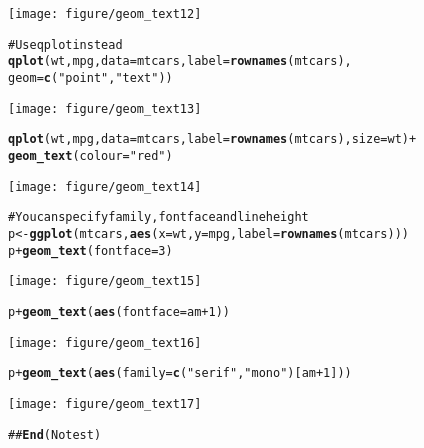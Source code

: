 \documentclass[a4paper,titlepage]{tufte-handout}\usepackage{graphicx, color}
\makeatletter
\def\maxwidth{ %
  \ifdim\Gin@nat@width>\linewidth
    \linewidth
  \else
    \Gin@nat@width
  \fi
}
\newcommand{\hlfunctioncall}[1]{\textcolor[rgb]{0.501960784313725,0,0.329411764705882}{\textbf{#1}}}%
\newcommand{\hlstring}[1]{\textcolor[rgb]{0.6,0.6,1}{#1}}%
\newcommand{\hlcomment}[1]{\textcolor[rgb]{0.180392156862745,0.6,0.341176470588235}{#1}}%
\newenvironment{kframe}{%
 \def\at@end@of@kframe{}%
 \ifinner\ifhmode%
  \def\at@end@of@kframe{\end{minipage}}%
  \begin{minipage}{\columnwidth}%
 \fi\fi%
 \def\FrameCommand##1{\hskip\@totalleftmargin \hskip-\fboxsep
 \colorbox{shadecolor}{##1}\hskip-\fboxsep
     \hskip-\linewidth \hskip-\@totalleftmargin \hskip\columnwidth}%
 \MakeFramed {\advance\hsize-\width
   \@totalleftmargin\z@ \linewidth\hsize
   \@setminipage}}%
 {\par\unskip\endMakeFramed%
 \at@end@of@kframe}
\newenvironment{knitrout}{}{} %
\makeatother
\begin{document}
\begin{knitrout}
\begin{kframe}
\begin{alltt}
\end{alltt}
\end{kframe}\texttt{[image: figure/geom\_text12]} \begin{kframe}\begin{alltt}
\hlcomment{# Use qplot instead}
\hlfunctioncall{qplot}(wt, mpg, data = mtcars, label = \hlfunctioncall{rownames}(mtcars),
   geom=\hlfunctioncall{c}(\hlstring{"point"}, \hlstring{"text"}))
\end{alltt}
\end{kframe}\texttt{[image: figure/geom\_text13]} \begin{kframe}\begin{alltt}
\hlfunctioncall{qplot}(wt, mpg, data = mtcars, label = \hlfunctioncall{rownames}(mtcars), size = wt) +
  \hlfunctioncall{geom_text}(colour = \hlstring{"red"})
\end{alltt}
\end{kframe}\texttt{[image: figure/geom\_text14]} \begin{kframe}\begin{alltt}
\hlcomment{# You can specify family, fontface and lineheight}
p <- \hlfunctioncall{ggplot}(mtcars, \hlfunctioncall{aes}(x=wt, y=mpg, label=\hlfunctioncall{rownames}(mtcars)))
p + \hlfunctioncall{geom_text}(fontface=3)
\end{alltt}
\end{kframe}\texttt{[image: figure/geom\_text15]} \begin{kframe}\begin{alltt}
p + \hlfunctioncall{geom_text}(\hlfunctioncall{aes}(fontface=am+1))
\end{alltt}
\end{kframe}\texttt{[image: figure/geom\_text16]} \begin{kframe}\begin{alltt}
p + \hlfunctioncall{geom_text}(\hlfunctioncall{aes}(family=\hlfunctioncall{c}(\hlstring{"serif"}, \hlstring{"mono"})[am+1]))
\end{alltt}
\end{kframe}\texttt{[image: figure/geom\_text17]} \begin{kframe}\begin{alltt}
\hlcomment{## \hlfunctioncall{End}(No test)}
\end{alltt}
\end{kframe}
\end{knitrout}
\end{document}
